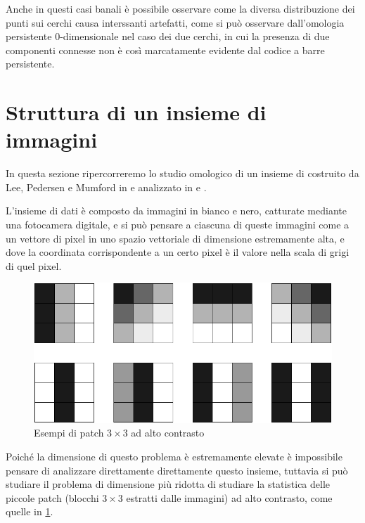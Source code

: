 Anche in questi casi banali è possibile osservare come la diversa distribuzione dei punti sui cerchi causa interssanti artefatti, come si può osservare dall'omologia persistente 0-dimensionale nel caso dei due cerchi, in cui la presenza di due componenti connesse non è così marcatamente evidente dal codice a barre persistente.


\section{Struttura di un insieme di immagini}

In questa sezione ripercorreremo lo studio omologico di un insieme di costruito da
Lee, Pedersen e Mumford in \cite{Lee2003} e analizzato in \cite{Carlsson2008} e \cite{DeSilva2004}.

L'insieme di dati è composto da immagini in bianco e nero, catturate mediante una fotocamera digitale, e si può pensare a ciascuna di queste immagini come a un vettore di pixel in uno spazio vettoriale di dimensione estremamente alta, e dove la coordinata corrispondente a un certo pixel è il valore nella scala di grigi di quel pixel.

\begin{figure}[ht]
  \begin{center}
    \includegraphics[width=.8\linewidth]{gfx/example_patches.pdf}
    \caption{Esempi di patch $3\times 3$ ad alto contrasto}
    \label{fig:examplepatches}
  \end{center}
\end{figure}

Poiché la dimensione di questo problema è estremamente elevate è impossibile pensare di analizzare direttamente direttamente questo insieme, tuttavia si può studiare il problema di dimensione più ridotta di studiare la statistica delle piccole patch (blocchi $3\times 3$ estratti dalle immagini) ad alto contrasto, come quelle in \cref{fig:examplepatches}.

